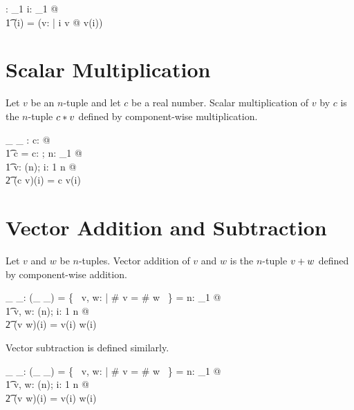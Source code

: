 \documentclass[11pt, oneside]{article}
\begin{document}
\begin{axdef}
	\pi: \nat_1 \fun \Rinf \pfun \R
\where
	\forall i: \nat_1 @ \\
	\t1	\pi(i) = (\lambda v: \Rinf | i \in \dom v @ v(i))
\end{axdef}

\section{Scalar Multiplication}

Let $v$ be an $n$-tuple and let $c$ be a real number.
Scalar multiplication of $v$ by $c$ is the $n$-tuple $c \mathbin{*} v$ defined by component-wise multiplication.

\begin{axdef}
	\_ \smulR \_ : \R \cross \Rinf \fun \Rinf 
\where
	\forall c: \R @ \\
	\t1	c \smulR \langle \rangle = \langle \rangle
\also
	\forall c: \R; n: \nat_1 @ \\
	\t1	\forall v: \Rtuples(n); i: 1 \upto n @ \\
	\t2		(c \smulR v)(i) = c \mulR v(i)
\end{axdef}

\section{Vector Addition and Subtraction}

Let $v$ and $w$ be $n$-tuples.
Vector addition of $v$ and $w$ is the $n$-tuple $v \mathbin{+} w$ defined by component-wise addition.

\begin{axdef}
	\_ \vaddR \_: \Rinf \cross \Rinf \pfun \Rinf
\where
	\dom(\_ \vaddR \_) = \{~ v, w: \Rinf | \# v = \# w ~\}
\also
	\langle \rangle \vaddR \langle \rangle = \langle \rangle
\also
	\forall n: \nat_1 @ \\
	\t1	\forall v, w: \Rtuples(n); i: 1 \upto n @ \\
	\t2		(v \vaddR w)(i) = v(i) \addR w(i)
\end{axdef}

Vector subtraction is defined similarly.

\begin{axdef}
	\_ \vsubR \_: \Rinf \cross \Rinf \pfun \Rinf
\where
	\dom(\_ \vsubR \_) = \{~ v, w: \Rinf | \# v = \# w ~\}
\also
	\langle \rangle \vsubR \langle \rangle = \langle \rangle
\also
	\forall n: \nat_1 @ \\
	\t1	\forall v, w: \Rtuples(n); i: 1 \upto n @ \\
	\t2		(v \vsubR w)(i) = v(i) \subR w(i)
\end{axdef}
\end{document}
